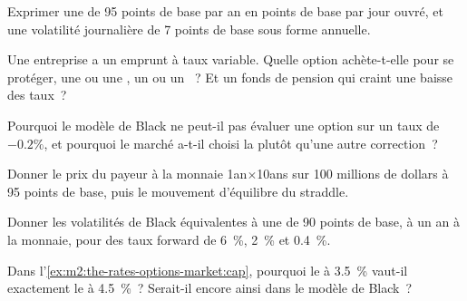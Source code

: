 \begin{exercise}[$\star$]\label{exo:m2:the-rates-options-market:1}
Exprimer une  de 95 points de base par an en points de base par
jour ouvré, et une volatilité journalière de 7 points de base sous forme annuelle.
\end{exercise}

\begin{exercise}[$\star$]\label{exo:m2:the-rates-options-market:2}
Une entreprise a un emprunt à taux variable. Quelle option achète-t-elle pour se protéger, une 
ou une , un  ou un ~? Et un fonds de pension qui craint une baisse
des taux~?
\end{exercise}

\begin{exercise}[$\star$]\label{exo:m2:the-rates-options-market:3}
Pourquoi le modèle de Black ne peut-il pas évaluer une option sur un taux de $-0.2\%$, et
pourquoi le marché a-t-il choisi la  plutôt qu'une autre correction~?
\end{exercise}

\begin{exercise}[$\star\star$]\label{exo:m2:the-rates-options-market:4}
Donner le prix du payeur à la monnaie 1an$\times$10ans sur 100 millions de dollars à
95 points de base, puis le mouvement d'équilibre du straddle.
\end{exercise}

\begin{exercise}[$\star\star$]\label{exo:m2:the-rates-options-market:5}
Donner les volatilités de Black équivalentes à une  de 90 points de base,
à un an à la monnaie, pour des taux forward de 6~\%, 2~\% et 0.4~\%.
\end{exercise}

\begin{exercise}[$\star\star$]\label{exo:m2:the-rates-options-market:6}
Dans l'\cref{ex:m2:the-rates-options-market:cap}, pourquoi le  à 3.5~\% vaut-il
exactement le  à 4.5~\%~? Serait-il encore ainsi dans le modèle de Black~?
\end{exercise}

